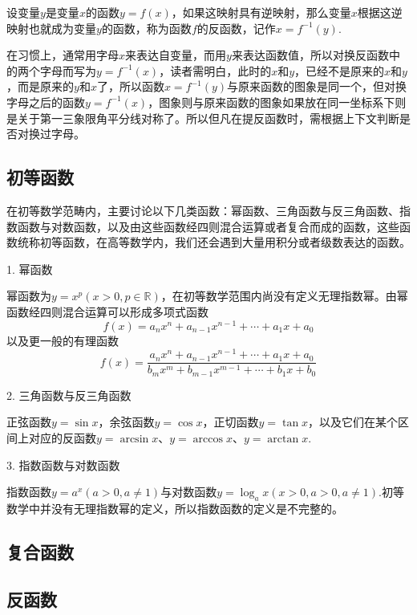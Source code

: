\begin{definition}
  设变量$y$是变量$x$的函数$y=f(x)$，如果这映射具有逆映射，那么变量$x$根据这逆映射也就成为变量$y$的函数，称为函数$f$的反函数，记作$x=f^{-1}(y)$.
\end{definition}

在习惯上，通常用字母$x$来表达自变量，而用$y$来表达函数值，所以对换反函数中的两个字母而写为$y=f^{-1}(x)$，读者需明白，此时的$x$和$y$，已经不是原来的$x$和$y$，而是原来的$y$和$x$了，所以函数$x=f^{-1}(y)$与原来函数的图象是同一个，但对换字母之后的函数$y=f^{-1}(x)$，图象则与原来函数的图象如果放在同一坐标系下则是关于第一三象限角平分线对称了。所以但凡在提反函数时，需根据上下文判断是否对换过字母。

\subsection{初等函数}
\label{sec:base-function}

在初等数学范畴内，主要讨论以下几类函数：幂函数、三角函数与反三角函数、指数函数与对数函数，以及由这些函数经四则混合运算或者复合而成的函数，这些函数统称初等函数，在高等数学内，我们还会遇到大量用积分或者级数表达的函数。

1. 幂函数

幂函数为$y=x^p(x>0,p \in \mathbb{R})$，在初等数学范围内尚没有定义无理指数幂。由幂函数经四则混合运算可以形成多项式函数
\[ f(x) = a_nx^n+a_{n-1}x^{n-1}+\cdots+a_1x+a_0 \]
以及更一般的有理函数
\[ f(x) = \frac{a_nx^n+a_{n-1}x^{n-1}+\cdots+a_1x+a_0}{b_mx^m+b_{m-1}x^{m-1}+\cdots+b_1x+b_0} \]

2. 三角函数与反三角函数

正弦函数$y=\sin{x}$，余弦函数$y=\cos{x}$，正切函数$y=\tan{x}$，以及它们在某个区间上对应的反函数$y=\arcsin{x}$、$y=\arccos{x}$、$y=\arctan{x}$.

3. 指数函数与对数函数

指数函数$y=a^x(a>0,a\neq 1)$与对数函数$y=\log_a x(x>0,a>0,a\neq 1)$.初等数学中并没有无理指数幂的定义，所以指数函数的定义是不完整的。

\subsection{复合函数}
\label{sec:complex-function}

\subsection{反函数}
\label{sec:reverse-function}

